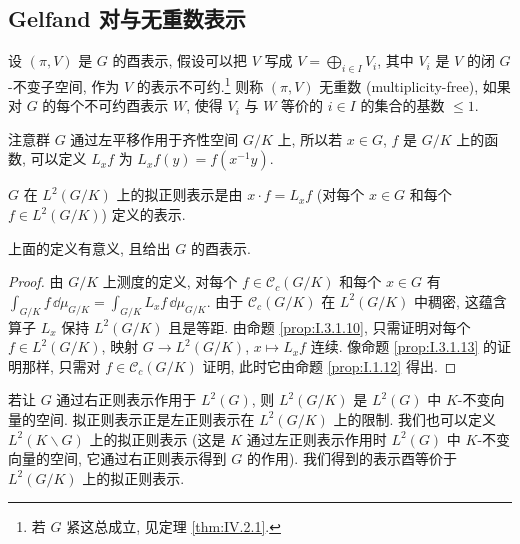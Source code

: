 \subsection{Gelfand 对与无重数表示}

\begin{definition}
\label{def:V.3.2.1}
设 $(\pi, V)$ 是 $G$ 的酉表示, 假设可以把 $V$ 写成 $V = \bigoplus_{i \in I}V_i$, 其中 $V_i$ 是 $V$ 的闭 $G$-不变子空间, 作为 $V$ 的表示不可约.\footnote{若 $G$ 紧这总成立, 见定理 \ref{thm:IV.2.1}.} 则称 $(\pi, V)$ 无重数 (multiplicity-free), 如果对 $G$ 的每个不可约酉表示 $W$, 使得 $V_i$ 与 $W$ 等价的 $i \in I$ 的集合的基数 $\leq 1$.
\end{definition}

注意群 $G$ 通过左平移作用于齐性空间 $G/K$ 上, 所以若 $x \in G$, $f$ 是 $G/K$ 上的函数, 可以定义 $L_xf$ 为 $L_xf(y) = f(x^{-1}y)$.

\begin{definition}
\label{def:V.3.2.2}
$G$ 在 $L^2(G/K)$ 上的拟正则表示是由 $x \cdot f = L_xf$ (对每个 $x \in G$ 和每个 $f \in L^2(G/K)$) 定义的表示.
\end{definition}

\begin{proposition}[拟正则表示是酉表示]
\label{prop:V.3.2.3}
上面的定义有意义, 且给出 $G$ 的酉表示.
\end{proposition}

\begin{proof}
由 $G/K$ 上测度的定义, 对每个 $f \in \mathcal{C}_c(G/K)$ 和每个 $x \in G$ 有 $\int_{G/K}f\,\dd\mu_{G/K} = \int_{G/K}L_xf\,\dd\mu_{G/K}$. 由于 $\mathcal{C}_c(G/K)$ 在 $L^2(G/K)$ 中稠密, 这蕴含算子 $L_x$ 保持 $L^2(G/K)$ 且是等距. 由命题 \ref{prop:I.3.1.10}, 只需证明对每个 $f \in L^2(G/K)$, 映射 $G \to L^2(G/K)$, $x \longmapsto L_xf$ 连续. 像命题 \ref{prop:I.3.1.13} 的证明那样, 只需对 $f \in \mathcal{C}_c(G/K)$ 证明, 此时它由命题 \ref{prop:I.1.12} 得出.
\end{proof}

\begin{remark}[另一种拟正则表示]
\label{rem:V.3.1}
若让 $G$ 通过右正则表示作用于 $L^2(G)$, 则 $L^2(G/K)$ 是 $L^2(G)$ 中 $K$-不变向量的空间. 拟正则表示正是左正则表示在 $L^2(G/K)$ 上的限制.
我们也可以定义 $L^2(K\backslash G)$ 上的拟正则表示 (这是 $K$ 通过左正则表示作用时 $L^2(G)$ 中 $K$-不变向量的空间, 它通过右正则表示得到 $G$ 的作用). 我们得到的表示酉等价于 $L^2(G/K)$ 上的拟正则表示.
\end{remark}

